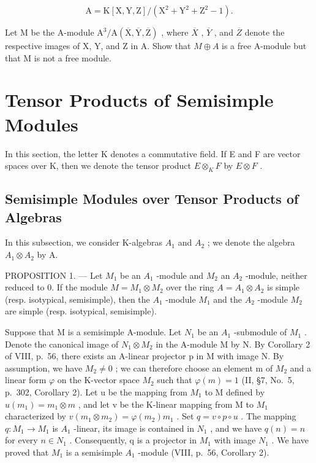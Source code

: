 \[
\mathrm{A} = \mathrm{K} [ \mathrm{X}, \mathrm{Y}, \mathrm{Z} ] / (\mathrm{X} ^ {2} + \mathrm{Y} ^ {2} + \mathrm{Z} ^ {2} - 1).
\]

Let M be the A-module \(\mathrm{A}^{3}/\mathrm{A}(\overline{\mathrm{X}},\overline{\mathrm{Y}},\overline{\mathrm{Z}})\) , where \(\overline{X}\) , \(\overline{Y}\) , and \(\overline{Z}\) denote the respective images of X, Y, and Z in A. Show that \(M\oplus A\) is a free A-module but that M is not a free module.

\section{Tensor Products of Semisimple Modules}

In this section, the letter K denotes a commutative field. If E and F are vector spaces over K, then we denote the tensor product \(E \otimes_{K} F\) by \(E \otimes F\) .

\subsection{Semisimple Modules over Tensor Products of Algebras}

In this subsection, we consider K-algebras \(A_{1}\) and \(A_{2}\) ; we denote the algebra \(A_{1} \otimes A_{2}\) by A.

PROPOSITION 1. --- Let \(M_{1}\) be an \(A_{1}\) -module and \(M_{2}\) an \(A_{2}\) -module, neither reduced to 0. If the module \(M = M_{1} \otimes M_{2}\) over the ring \(A = A_{1} \otimes A_{2}\) is simple (resp. isotypical, semisimple), then the \(A_{1}\) -module \(M_{1}\) and the \(A_{2}\) -module \(M_{2}\) are simple (resp. isotypical, semisimple).

Suppose that M is a semisimple A-module. Let \(N_{1}\) be an \(A_{1}\) -submodule of \(M_{1}\) . Denote the canonical image of \(N_{1} \otimes M_{2}\) in the A-module M by N. By Corollary 2 of VIII, p.~56, there exists an A-linear projector p in M with image N. By assumption, we have \(M_{2} \neq 0\) ; we can therefore choose an element m of \(M_{2}\) and a linear form \(\varphi\) on the K-vector space \(M_{2}\) such that \(\varphi(m) = 1\) (II, §7, No.~5, p.~302, Corollary 2). Let u be the mapping from \(M_{1}\) to M defined by \(u(m_{1}) = m_{1} \otimes m\) , and let v be the K-linear mapping from M to \(M_{1}\) characterized by \(v(m_{1} \otimes m_{2}) = \varphi(m_{2})m_{1}\) . Set \(q = v \circ p \circ u\) . The mapping \(q : M_{1} \to M_{1}\) is \(A_{1}\) -linear, its image is contained in \(N_{1}\) , and we have \(q(n) = n\) for every \(n \in N_{1}\) . Consequently, q is a projector in \(M_{1}\) with image \(N_{1}\) . We have proved that \(M_{1}\) is a semisimple \(A_{1}\) -module (VIII, p.~56, Corollary 2).

